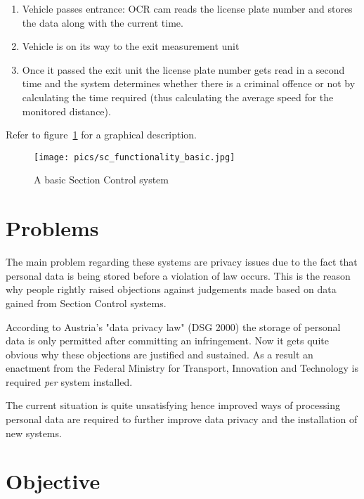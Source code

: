 \documentclass[oneside,bachelor,etd]{BYUPhys}
\begin{document}
\begin{enumerate}
\item Vehicle passes entrance: OCR cam reads the license plate number and stores the data along with the current time.
\item Vehicle is on its way to the exit measurement unit
\item Once it passed the exit unit the license plate number gets read in a second time and 
the system determines whether there is a criminal offence or not by calculating the time required 
(thus calculating the average speed for the monitored distance).
\end{enumerate}

Refer to figure~\ref{fig:Section Control Functionality} for a graphical description.

\begin{figure}
    \centerline{\texttt{[image: pics/sc\_functionality\_basic.jpg]}}
    \caption[Section Control Functionality]{\label{fig:Section Control Functionality}
	A basic Section Control system}
\end{figure}


\section{Problems}
\label{sec:1problems}

The main problem regarding these systems are privacy issues due to the fact that personal data is being stored before a violation of law occurs. 
This is the reason why people rightly raised objections against judgements made based on data gained from Section Control systems. 
\par According to Austria's "data privacy law" (DSG 2000) the storage of personal data is only permitted after committing an infringement. 
Now it gets quite obvious why these objections are justified and sustained. As a result an enactment from 
the Federal Ministry for Transport, Innovation and Technology is required \textit{per} system installed.
\par The current situation is quite unsatisfying hence improved ways of processing personal data are required to further improve 
data privacy and the installation of new systems.


\section{Objective}
\label{sec:1objective}
\end{document}
